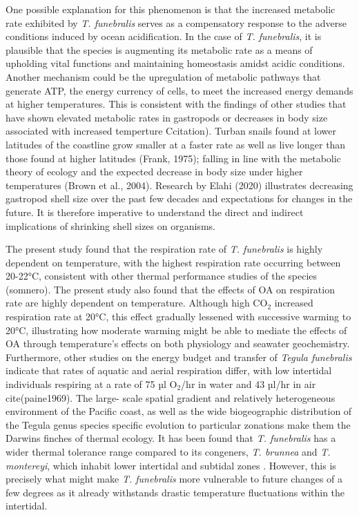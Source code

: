 \documentclass[
  12pt,
]{article}
\begin{document}
One possible explanation for this phenomenon is that the increased
metabolic rate exhibited by \textit{T. funebralis} serves as a
compensatory response to the adverse conditions induced by ocean
acidification. In the case of \textit{T. funebralis}, it is plausible
that the species is augmenting its metabolic rate as a means of
upholding vital functions and maintaining homeostasis amidst acidic
conditions. Another mechanism could be the upregulation of metabolic
pathways that generate ATP, the energy currency of cells, to meet the
increased energy demands at higher temperatures. This is consistent with
the findings of other studies that have shown elevated metabolic rates
in gastropods or decreases in body size associated with increased
temperture Ccitation). Turban snails found at lower latitudes of the
coastline grow smaller at a faster rate as well as live longer than
those found at higher latitudes (Frank, 1975); falling in line with the
metabolic theory of ecology and the expected decrease in body size under
higher temperatures (Brown et al., 2004). Research by Elahi (2020)
illustrates decreasing gastropod shell size over the past few decades
and expectations for changes in the future. It is therefore imperative
to understand the direct and indirect implications of shrinking shell
sizes on organisms.

The present study found that the respiration rate of
\textit{T. funebralis} is highly dependent on temperature, with the
highest respiration rate occurring between 20-22°C, consistent with
other thermal performance studies of the species (somnero). The present
study also found that the effects of OA on respiration rate are highly
dependent on temperature. Although high CO\(_2\) increased respiration
rate at 20°C, this effect gradually lessened with successive warming to
20°C, illustrating how moderate warming might be able to mediate the
effects of OA through temperature's effects on both physiology and
seawater geochemistry. Furthermore, other studies on the energy budget
and transfer of \textit{Tegula funebralis} indicate that rates of
aquatic and aerial respiration differ, with low intertidal individuals
respiring at a rate of 75 µl O\(_2\)/hr in water and 43 µl/hr in air
cite(paine1969). The large- scale spatial gradient and relatively
heterogeneous environment of the Pacific coast, as well as the wide
biogeographic distribution of the Tegula genus species specific
evolution to particular zonations make them the Darwins finches of
thermal ecology. It has been found that \textit{T. funebralis} has a
wider thermal tolerance range compared to its congeners,
\textit{T. brunnea} and \textit{T. montereyi}, which inhabit lower
intertidal and subtidal zones \cite{tomanek1999evolutionary}. However,
this is precisely what might make \textit{T. funebralis} more vulnerable
to future changes of a few degrees as it already withstands drastic
temperature fluctuations within the intertidal.
\end{document}
